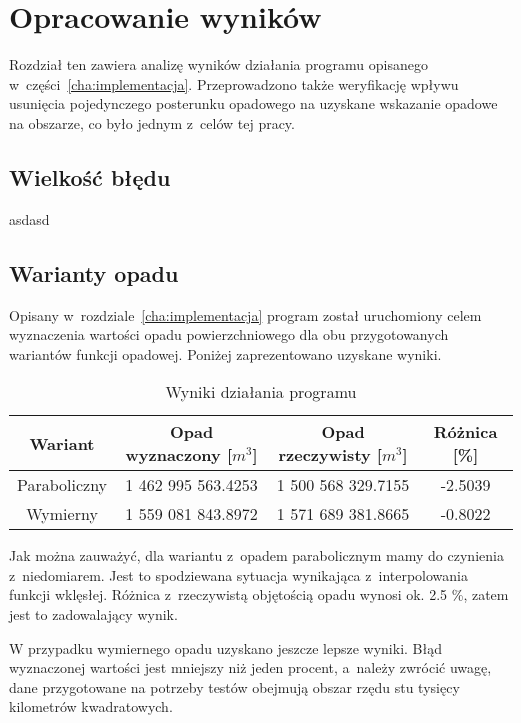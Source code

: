 \chapter{Opracowanie wyników}

Rozdział ten zawiera analizę wyników działania programu opisanego w~części~\ref{cha:implementacja}. Przeprowadzono także weryfikację wpływu usunięcia pojedynczego posterunku opadowego na uzyskane wskazanie opadowe na obszarze, co było jednym z~celów tej pracy.


\section{Wielkość błędu}
asdasd

\section{Warianty opadu}
Opisany w~rozdziale~\ref{cha:implementacja} program został uruchomiony celem wyznaczenia wartości opadu powierzchniowego dla obu przygotowanych wariantów funkcji opadowej. Poniżej zaprezentowano uzyskane wyniki.

\begin{table}[!ht]
\caption{Wyniki działania programu}
\begin{center}
\begin{tabular}{|c|c|c|c|}
\hline
 Wariant      & Opad wyznaczony [$m^3$] & Opad rzeczywisty [$m^3$] & Różnica [\%] \\ \hline \hline

 Paraboliczny & 1 462 995 563.4253  &   1 500 568 329.7155  &  -2.5039 \\ \hline
 Wymierny     & 1 559 081 843.8972  &   1 571 689 381.8665  &  -0.8022 \\ \hline

\end{tabular}
\end{center}
\end{table}

Jak można zauważyć, dla wariantu z~opadem parabolicznym mamy do czynienia z~niedomiarem. Jest to spodziewana sytuacja wynikająca z~interpolowania funkcji wklęsłej. Różnica z~rzeczywistą objętością opadu wynosi ok. 2.5 \%, zatem jest to zadowalający wynik.

W przypadku wymiernego opadu uzyskano jeszcze lepsze wyniki. Błąd wyznaczonej wartości jest mniejszy niż jeden procent, a~należy zwrócić uwagę, dane przygotowane na potrzeby testów obejmują obszar rzędu stu tysięcy kilometrów kwadratowych.




